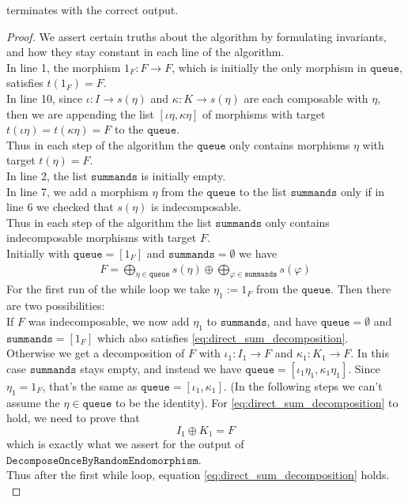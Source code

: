 \begin{lemma}
 terminates with the correct output.
\end{lemma}
\begin{proof} We assert certain truths about the algorithm by formulating invariants, and how they stay constant in each line of the algorithm.\\

\noindent In line 1, the morphism $1_{F} : F \rightarrow F$, which is initially the only morphism in $\mathtt{queue}$, satisfies $t(1_{F}) = F$.\\
In line 10, since $\iota : I \rightarrow s(\eta)$ and $\kappa : K \rightarrow s(\eta)$ are each composable with $\eta$, then we are
appending the list $[\iota\eta, \kappa\eta]$ of morphisms with target $t(\iota\eta) = t(\kappa\eta) = F$ to the $\mathtt{queue}$.\\
Thus in each step of the algorithm the $\mathtt{queue}$ only contains morphisms $\eta$ with target $t(\eta) = F$.\\

\noindent In line 2, the list $\mathtt{summands}$ is initially empty.\\
In line 7, we add a morphism $\eta$ from the $\mathtt{queue}$ to the list $\mathtt{summands}$ only if
in line 6 we checked that $s(\eta)$ is indecomposable.\\
Thus in each step of the algorithm the list $\mathtt{summands}$ only contains indecomposable morphisms with target $F$.\\

\noindent Initially with $\mathtt{queue} = [1_{F}]$ and $\mathtt{summands} = \emptyset$ we have
\begin{align}
F = \label{eq:direct_sum_decomposition}
\bigoplus_{\eta \in \mathtt{queue}} s(\eta) \oplus \bigoplus_{\varphi \in \mathtt{summands}} s(\varphi)
\end{align}
For the first run of the while loop we take $\eta_{1} := 1_{F}$ from the $\mathtt{queue}$. Then there are two possibilities:\\
If $F$ was indecomposable, we now add $\eta_{1}$ to $\mathtt{summands}$, and have $\mathtt{queue} = \emptyset$ and
$\mathtt{summands} = [1_{F}]$ which also satisfies \eqref{eq:direct_sum_decomposition}.\\
Otherwise we get a decomposition of $F$ with $\iota_{1} : I_{1} \rightarrow F$ and $\kappa_{1} : K_{1} \rightarrow F$. In this case
$\mathtt{summands}$ stays empty, and instead we have $\mathtt{queue} = [\iota_{1}\eta_{1}, \kappa_{1}\eta_{1}]$. Since
$\eta_{1} = 1_{F}$, that's the same as $\mathtt{queue} = [\iota_{1},\kappa_{1}]$. (In the following steps we can't assume the
$\eta \in \mathtt{queue}$ to be the identity). For \eqref{eq:direct_sum_decomposition} to hold, we need to prove that
\[
I_{1} \oplus K_{1} = F
\]
which is exactly what we assert for the output of $\mathtt{DecomposeOnceByRandomEndomorphism}$.\\
Thus after the first while loop, equation \eqref{eq:direct_sum_decomposition} holds.\\



\end{proof}

